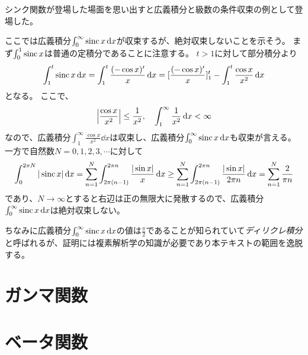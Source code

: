 シンク関数が登場した場面を思い出すと広義積分と級数の条件収束の例として登場した。

ここでは広義積分$\int_0^\infty \operatorname{sinc} x\dd{x}$が収束するが、絶対収束しないことを示そう。
まず$\int_0^1 \operatorname{sinc} x$は普通の定積分であることに注意する。
$t > 1$に対して部分積分より
$$
\int_1^t \operatorname{sinc} x\dd{x} = \int_1^t \frac{(-\cos x)'}{x}\dd{x} = [\frac{(-\cos x)'}{x}]_1^t-\int_1^t \frac{\cos x}{x^2}\dd{x}
$$
となる。
ここで、
$$
\abs{\frac{\cos x}{x^2}} \le \frac{1}{x^2},
\quad \int_1^\infty \frac{1}{x^2}\dd{x} < \infty
$$
なので、広義積分$\int_1^\infty \frac{\cos x}{x^2}\dd{x}$は収束し、広義積分$\int_0^\infty \operatorname{sinc} x\dd{x}$も収束が言える。
一方で自然数$N = 0, 1, 2, 3, \cdots$に対して
$$
\int_0^{2\pi N} |\operatorname{sinc} x|\dd{x} = \sum_{n = 1}^N \int_{2\pi(n-1)}^{2\pi n} \frac{|\sin x|}{x}\dd{x} \ge \sum_{n = 1}^N \int_{2\pi(n-1)}^{2\pi n} \frac{|\sin x|}{2\pi n}\dd{x} = \sum_{n = 1}^N \frac{2}{\pi n}
$$
であり、$N \to \infty$とすると右辺は正の無限大に発散するので、広義積分$\int_0^\infty \operatorname{sinc} x\dd{x}$は絶対収束しない。

ちなみに広義積分$\int_0^\infty \operatorname{sinc} x\dd{x}$の値は$\frac{\pi}{2}$であることが知られていて\emph{ディリクレ積分}と呼ばれるが、証明には複素解析学の知識が必要であり本テキストの範囲を逸脱する。

\section{ガンマ関数}

\section{ベータ関数}
